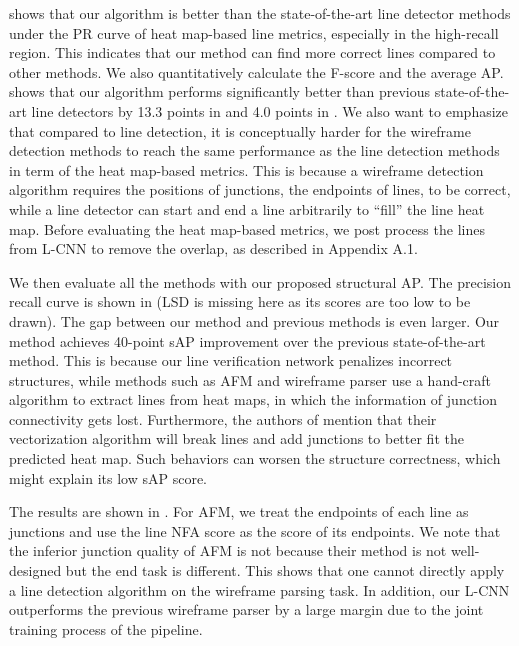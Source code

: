 \documentclass[10pt,twocolumn,letterpaper]{article}
\newcommand{\N}[1]{{\color{red}{#1}}}
\renewcommand{\N}[1]{{{#1}}}
\begin{document}
 shows that our algorithm is better than the state-of-the-art line detector methods under the PR curve of heat map-based line metrics, especially in the high-recall region. This indicates that our method can find more correct lines compared to other methods. We also quantitatively calculate the F-score and the average AP.    shows that our algorithm performs significantly better than previous state-of-the-art line detectors by 13.3 points in  and 4.0 points in  \cite{xue2018learning}.  We also want to emphasize that compared to line detection, it is conceptually harder for the wireframe detection methods to reach the same performance as the line detection methods in term of the heat map-based metrics.  This is because a wireframe detection algorithm requires the positions of junctions, the endpoints of lines, to be correct, while a line detector can start and end a line arbitrarily to ``fill'' the line heat map.  Before evaluating the heat map-based metrics, we post process the lines from L-CNN to remove the overlap, as described in \N{Appendix A.1}.

We then evaluate all the methods with our proposed structural AP. The precision recall curve is shown in  (LSD is missing here as its scores are too low to be drawn). The gap between our method and previous methods is even larger.  Our method achieves 40-point sAP improvement over the previous state-of-the-art method.  This is because our line verification network penalizes incorrect structures, while methods such as AFM and wireframe parser use a hand-craft algorithm to extract lines from heat maps, in which the information of junction connectivity gets lost.  Furthermore, the authors of \cite{Huang:2018:LPW} mention that their vectorization algorithm will break lines and add junctions to better fit the predicted heat map.  Such behaviors can worsen the structure correctness, which might explain its low sAP score.

The {} results are shown in . For AFM, we treat the endpoints of each line as junctions and use the line NFA score as the score of its endpoints. We note that the inferior junction quality of AFM is not because their method is not well-designed but the end task is different. This shows that one cannot directly apply a line detection algorithm on the wireframe parsing task. In addition, our L-CNN outperforms the previous wireframe parser \cite{Huang:2018:LPW} by a large margin due to the \N{joint training process of the pipeline}.
\end{document}
